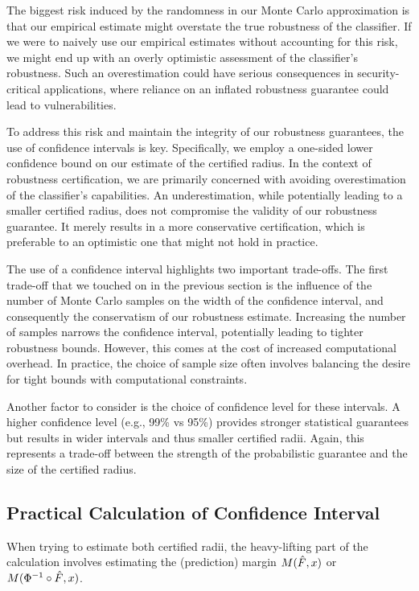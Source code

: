 The biggest risk induced by the randomness in our Monte Carlo approximation is that our empirical estimate might overstate the true robustness of the classifier.
If we were to naively use our empirical estimates without accounting for this risk, we might end up with an overly optimistic assessment of the classifier's robustness.
Such an overestimation could have serious consequences in security-critical applications, where reliance on an inflated robustness guarantee could lead to vulnerabilities.

To address this risk and maintain the integrity of our robustness guarantees, the use of confidence intervals is key.
Specifically, we employ a one-sided lower confidence bound on our estimate of the certified radius.
In the context of robustness certification, we are primarily concerned with avoiding overestimation of the classifier's capabilities.
An underestimation, while potentially leading to a smaller certified radius, does not compromise the validity of our robustness guarantee.
It merely results in a more conservative certification, which is preferable to an optimistic one that might not hold in practice.

The use of a confidence interval highlights two important trade-offs.
The first trade-off that we touched on in the previous section is the influence of the number of Monte Carlo samples on the width of the confidence interval, and consequently the conservatism of our robustness estimate.
Increasing the number of samples narrows the confidence interval, potentially leading to tighter robustness bounds.
However, this comes at the cost of increased computational overhead.
In practice, the choice of sample size often involves balancing the desire for tight bounds with computational constraints.

Another factor to consider is the choice of confidence level for these intervals.
A higher confidence level (e.g., 99\% vs 95\%) provides stronger statistical guarantees but results in wider intervals and thus smaller certified radii.
Again, this represents a trade-off between the strength of the probabilistic guarantee and the size of the certified radius.

\subsection{Practical Calculation of Confidence Interval}\label{subsec:practical-calculation-of-confidence-interval}

When trying to estimate both certified radii, the heavy-lifting part of the calculation involves estimating the (prediction) margin $M(\Hat{F},x)$ or $M(\Phi^{-1}\circ\Hat{F},x)$.

